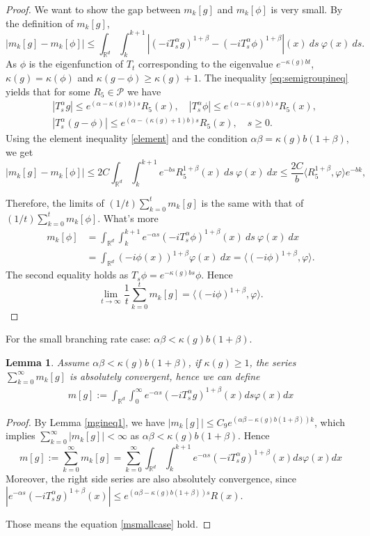 \documentclass[12pt, a4paper]{amsart}
\newtheorem{lem}[thm]{Lemma}
\theoremstyle{definition}
\numberwithin{equation}{section}
\begin{document}
\begin{proof}
    We want to show the gap between $m_k[g]$ and $m_k[\phi]$ is very small. By the definition of $m_k[g]$,
    $$|m_k[g]-m_k[\phi]|\leq\int_{\mathbb{R}^d}\int_k^{k+1}\left|(-i T^{\alpha}_s g)^{1+\beta}-(-i T^{\alpha}_s \phi)^{1+\beta}\right|(x)~ds~\varphi(x)~ds.$$
    As $\phi$ is the eigenfunction of $T_t$ corresponding to the eigenvalue $e^{-\kappa(g)bt}$,  $\kappa(g)=\kappa(\phi)$ and $\kappa(g-\phi)\geq \kappa(g)+1$. The inequality \eqref{eq:semigroupineq} yields that for some $R_5\in\mathcal{P}$ we have
    \begin{align*}
        &|T_s^{\alpha}g|\leq e^{(\alpha-\kappa(g)b)s}R_5(x), \quad|T_s^{\alpha}\phi|\leq e^{(\alpha-\kappa(g)b)s}R_5(x), \\
        &|T_s^{\alpha}(g-\phi)|\leq e^{(\alpha-(\kappa(g)+1)b)s}R_5(x), \quad s\geq0.
    \end{align*}
  Using the element inequality \eqref{element} and the condition $\alpha\beta=\kappa(g)b(1+\beta)$, we get
    $$|m_k[g]-m_k[\phi]|\leq2C\int_{\mathbb{R}^d}\int_k^{k+1}e^{-bs}R_5^{1+\beta}(x)~ds~\varphi(x)~dx\leq \frac{2C}{b}\langle R_5^{1+\beta},\varphi\rangle e^{-bk},$$

    Therefore, the limits of $(1/t)\sum_{k=0}^tm_k[g]$ is the same with that of $(1/t)\sum_{k=0}^tm_k[\phi]$. What's more
    \begin{align*}
        m_k[\phi]&=\int_{\mathbb{R}^d}\int_k^{k+1} e^{-\alpha s}(-iT_{s}^{\alpha}\phi)^{1+\beta}(x)~ds~\varphi(x)~dx\\
        &=\int_{\mathbb{R}^d}(-i\phi(x))^{1+\beta}\varphi (x)~dx=\langle (-i\phi)^{1+\beta},\varphi\rangle.
    \end{align*}
    The second equality holds as $T_s\phi=e^{-\kappa(g)bs}\phi$. Hence
    $$\lim_{t\rightarrow \infty}\frac{1}{t}\sum_{k=0}^{t}m_k[g]=\langle(-i\phi)^{1+\beta},\varphi\rangle.$$
\end{proof}

For the small branching rate case: $\alpha\beta<\kappa(g)b(1+\beta)$.
\begin{lem}\label{lemma211}
Assume $\alpha\beta<\kappa(g)b(1+\beta)$, if $\kappa(g)\geq 1$, the series $\sum_{k=0}^{\infty}m_k[g]$ is absolutely convergent, hence we can define
\begin{align}
    m[g]:=\int_{\mathbb{R}^d}\int_0^{\infty} e^{-\alpha s}(-iT_{s}^{\alpha}g)^{1+\beta}(x)ds\varphi(x)dx \label{msmallcase}
\end{align}
\end{lem}
\begin{proof}
    By Lemma \ref{mgineq1}, we have $|m_k[g]|\leq C_9 e^{(\alpha\beta-\kappa(g)b(1+\beta))k}$, which implies $\sum_{k=0}^{\infty}|m_k[g]|<\infty$ as $\alpha\beta<\kappa(g)b(1+\beta)$. Hence
    $$m[g]:=\sum_{k=0}^{\infty}m_k[g]=\sum_{k=0}^{\infty}\int_{\mathbb{R}^d}\int_k^{k+1} e^{-\alpha s}(-iT_{s}^{\alpha}g)^{1+\beta}(x)ds\varphi(x)dx$$
     Moreover, the right side series are also absolutely convergence, since $|e^{-\alpha s}(-iT_{s}^{\alpha}g)^{1+\beta}(x)|\leq e^{(\alpha\beta-\kappa(g)b(1+\beta))s}R(x)$.

     Those means the equation \eqref{msmallcase} hold.
\end{proof}
\end{document}
